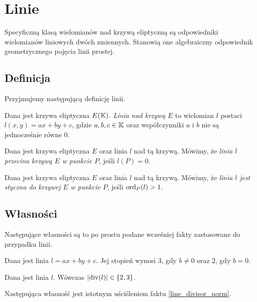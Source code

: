\section{Linie}

Specyficzną klasą wielomianów nad krzywą eliptyczną
są odpowiedniki wielomianów liniowych dwóch zmiennych.
Stanowią one algebraiczny odpowiednik
geometrycznego pojęcia linii prostej.

\subsection*{Definicja}

Przyjmujemy następującą definicję linii.

\begin{definition}
Dana jest krzywa eliptyczna $E(\mathbb{K})$.
\emph{Linia nad krzywą $E$}
to wielomian $l$ postaci $l(x, y) = ax + by +c$,
gdzie $a, b, c \in \mathbb{K}$
oraz współczynniki $a$ i $b$ nie są jednocześnie równe $0$.
\end{definition}

\begin{definition}
Dana jest krzywa eliptyczna $E$ oraz linia $l$ nad tą krzywą.
Mówimy, że \emph{linia $l$ przecina krzywą $E$ w punkcie $P$},
jeśli $l(P) = 0$.
\end{definition}

\begin{definition}
Dana jest krzywa eliptyczna $E$ oraz linia $l$ nad tą krzywą.
Mówimy, że \emph{linia $l$ jest styczna do krzywej $E$ w punkcie $P$},
jeśli $\operatorname{ord}_P(l) > 1$.
\end{definition}

\subsection*{Własności}

Następujące własności są to po prostu podane wcześniej fakty
zastosowane do przypadku linii.

\begin{fact}
Dana jest linia $l = ax + by + c$.
Jej stopień wynosi $3$, gdy $b \neq 0$
oraz $2$, gdy $b = 0$.
\end{fact}

\begin{fact}\label{line_divisor_norm}
Dana jest linia $l$.
Wówczas $\lvert\operatorname{div}(l)\rvert \in \{2,3\}$.
\end{fact}

Następująca własność jest istotnym uściśleniem faktu \ref{line_divisor_norm}.

